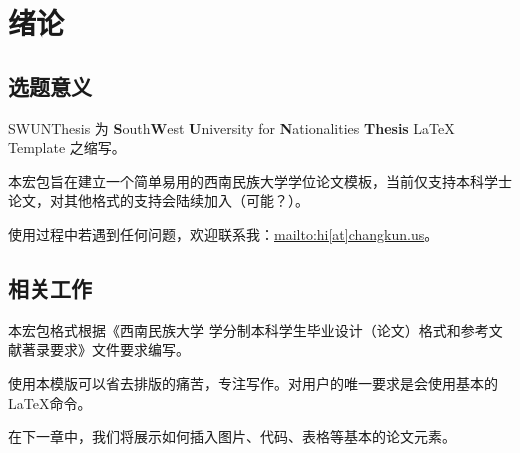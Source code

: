 ﻿\chapter{绪论}
\section{选题意义}
SWUNThesis 为 \textbf{S}outh\textbf{W}est \textbf{U}niversity for \textbf{N}ationalities \textbf{Thesis} LaTeX Template 之缩写。

本宏包旨在建立一个简单易用的西南民族大学学位论文模板，当前仅支持本科学士论文，对其他格式的支持会陆续加入（可能？）。

使用过程中若遇到任何问题，欢迎联系我：\url{mailto:hi[at]changkun.us}。

\section{相关工作}

本宏包格式根据《西南民族大学
学分制本科学生毕业设计（论文）格式和参考文献著录要求》文件要求编写。

使用本模版可以省去排版的痛苦，专注写作。对用户的唯一要求是会使用基本的 \LaTeX 命令。

在下一章中，我们将展示如何插入图片、代码、表格等基本的论文元素。
